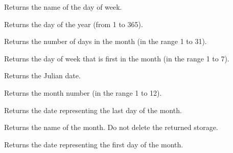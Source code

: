 \label{wxdategetdayofweekname}


Returns the name of the day of week.

\label{wxdategetdayofyear}


Returns the day of the year (from 1 to 365).

\label{wxdategetdaysinmonth}


Returns the number of days in the month (in the range 1 to 31).

\label{wxdategetfirstdayofmonth}


Returns the day of week that is first in the month (in the range 1 to 7).

\label{wxdategetjuliandate}


Returns the Julian date.

\label{wxdategetmonth}


Returns the month number (in the range 1 to 12).



Returns the date representing the last day of the month.

\label{wxdategetmonthname}


Returns the name of the month. Do not delete the returned storage.

\label{wxdategetmonthstart}


Returns the date representing the first day of the month.

\label{wxdategetweekofmonth}


